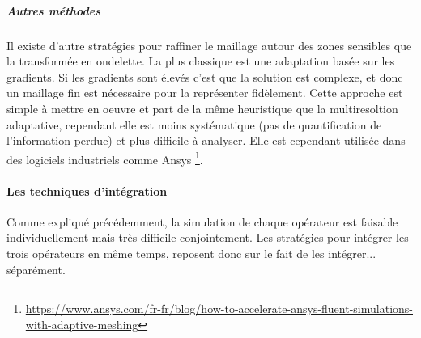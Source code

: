         \subparagraph{Autres méthodes}
        Il existe d'autre stratégies pour raffiner le maillage autour des zones sensibles que la transformée en ondelette. 
        La plus classique est une adaptation basée sur les gradients. Si les gradients sont élevés c'est que la solution est complexe,
        et donc un maillage fin est nécessaire pour la représenter fidèlement. Cette approche est simple à mettre en oeuvre et part de la même heuristique 
        que la multiresoltion adaptative, cependant elle est moins systématique (pas de quantification de l'information perdue) et plus difficile à analyser. 
        Elle est cependant utilisée dans des logiciels industriels comme Ansys 
        \footnote{\href{https://w.ww.ansys.com/fr-fr/blog/how-to-accelerate-ansys-fluent-simulations-with-adaptive-meshing}{https://www.ansys.com/fr-fr/blog/how-to-accelerate-ansys-fluent-simulations-with-adaptive-meshing}}.

    \paragraph{Les techniques d'intégration}
        Comme expliqué précédemment, la simulation de chaque opérateur est faisable individuellement mais très difficile conjointement.
        Les stratégies pour intégrer les trois opérateurs en même temps, reposent donc sur le fait de les intégrer... séparément.

